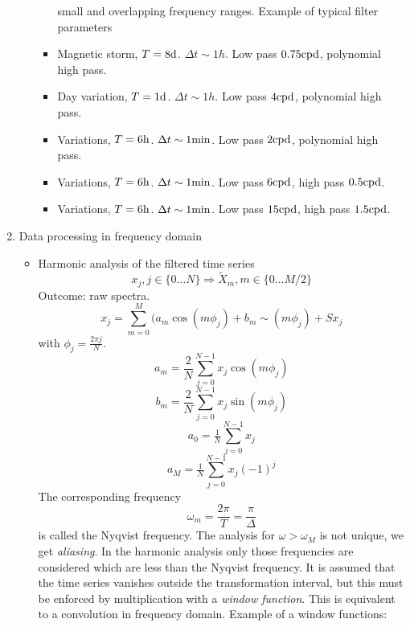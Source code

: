 \begin{enumerate}
\begin{itemize}
\begin{itemize}
      small and overlapping frequency ranges. Example of typical filter
      parameters
    \item
      Magnetic storm, \(T = 8\mathrm{d}\). \(\Delta t\sim 1 h\). Low pass
      \(0.75\mathrm{cpd}\), polynomial high pass.
    \item
      Day variation, \(T = 1\mathrm{d}\). \(\Delta t\sim 1 h\). Low pass
      \(4\mathrm{cpd}\), polynomial high pass.
    \item
      Variations, \(T = 6\mathrm{h}\). \(\Delta t\sim 1 \mathrm{min}\).
      Low pass \(2\mathrm{cpd}\), polynomial high pass.
    \item
      Variations, \(T = 6\mathrm{h}\). \(\Delta t\sim 1 \mathrm{min}\).
      Low pass \(6\mathrm{cpd}\), high pass \(0.5\mathrm{cpd}\).
    \item
      Variations, \(T = 6\mathrm{h}\). \(\Delta t\sim 1 \mathrm{min}\).
      Low pass \(15\mathrm{cpd}\), high pass \(1.5\mathrm{cpd}\).
    \end{itemize}
  \end{itemize}
\item
  Data processing in frequency domain

  \begin{itemize}
  \tightlist
  \item
    Harmonic analysis of the filtered time series \[
       x_j , j\in\{0\ldots N\}
        \Rightarrow \tilde{X}_m, m\in\{0\ldots M/2\}
     \] Outcome: raw spectra. \[
       x_j = \sum_{m=0}^{M} (a_m\cos(m\phi_j) + b_m\sim(m\phi_j) + S x_j
     \] with \(\phi_j = \frac{2\pi j}{N}\). \[
       a_m = \frac{2}N \sum_{j=0}^{N-1} x_j\cos(m\phi_j)
     \] \[
       b_m = \frac{2}N \sum_{j=0}^{N-1} x_j\sin(m\phi_j)
     \] \[
       a_0 = \tfrac1N \sum_{j=0}^{N-1} x_j
     \] \[
       a_M = \tfrac1N \sum_{j=0}^{N-1} x_j(-1)^j
     \] The corresponding frequency \[
       \omega_m = \frac{2\pi}{T} = \frac{\pi}\Delta
     \] is called the Nyqvist frequency. The analysis for
    \(\omega > \omega_M\) is not unique, we get \emph{aliasing}. In the
    harmonic analysis only those frequencies are considered which are
    less than the Nyqvist frequency. It is assumed that the time series
    vanishes outside the transformation interval, but this must be
    enforced by multiplication with a \emph{window function}. This is
    equivalent to a convolution in frequency domain. Example of a window
    functions:


\end{itemize}
\end{enumerate}
